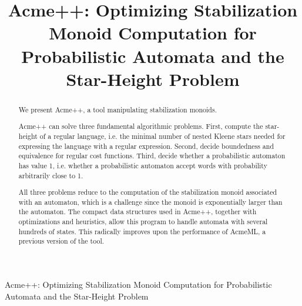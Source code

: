 \documentclass[11pt]{llncs}
\title{Acme++: Optimizing Stabilization Monoid Computation for Probabilistic Automata and the Star-Height Problem}
\begin{document}
\begin{center}
{\large
Acme++: Optimizing Stabilization Monoid Computation for Probabilistic Automata and the Star-Height Problem}
\end{center}

\begin{abstract}
We present Acme++, a tool manipulating stabilization monoids.

Acme++ can solve three fundamental algorithmic problems.  First, compute
the star-height of a regular language, i.e. the minimal number of
nested Kleene stars needed for expressing the language with a regular expression. Second, decide boundedness and equivalence for regular cost functions. Third, decide whether a
probabilistic automaton has value 1, i.e. whether a probabilistic
automaton accept words with probability arbitrarily close to 1.

All three problems reduce to the computation of the stabilization monoid associated with an automaton,
which is a challenge since the monoid is exponentially larger than the automaton.
The compact data structures used in Acme++, together with optimizations and heuristics, allow this program to handle automata with
several hundreds of states. This radically improves upon the performance of AcmeML,
a previous version of the tool.
\end{abstract}















\end{document}
